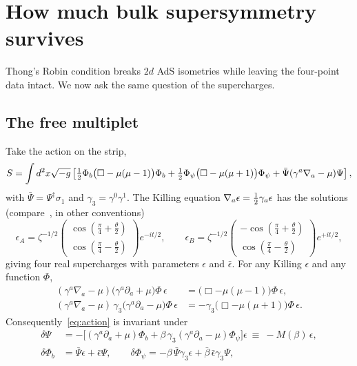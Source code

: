 \section{How much bulk supersymmetry survives}
\label{sec:susy}

Thong's Robin condition breaks $2d$ AdS isometries while leaving the four-point data intact. We now ask the same question of the supercharges.

\subsection{The free multiplet}

Take the action on the strip,
\begin{equation}\label{eq:action}
S=\int d^2x\sqrt{-g}\left[\tfrac12\Phi_b\big(\Box-\mu(\mu-1)\big)\Phi_b+\tfrac12\Phi_\psi\big(\Box-\mu(\mu+1)\big)\Phi_\psi+\bar\Psi(\gamma^a\nabla_a-\mu)\Psi\right],
\end{equation}
with $\bar\Psi=\Psi^\dagger\sigma_1$ and $\gamma_3=\gamma^0\gamma^1$. The Killing equation $\nabla_a\epsilon=\tfrac12\gamma_a\epsilon$ has the solutions (compare~\cite[(A.7)]{Correa:2019rdk}, in other conventions)
\begin{equation}\label{eq:killing}
\epsilon_A=\zeta^{-1/2}\begin{pmatrix}\cos(\frac\pi4+\frac\theta2)\\ \cos(\frac\pi4-\frac\theta2)\end{pmatrix}e^{-it/2},\qquad\epsilon_B=\zeta^{-1/2}\begin{pmatrix}-\cos(\frac\pi4+\frac\theta2)\\ \cos(\frac\pi4-\frac\theta2)\end{pmatrix}e^{+it/2},
\end{equation}
giving four real supercharges with parameters $\epsilon$ and $\bar\epsilon$. For any Killing $\epsilon$ and any function $\Phi$,
\begin{equation}\label{eq:intertwine}
\begin{aligned}
(\gamma^a\nabla_a-\mu)\big(\gamma^a\partial_a+\mu\big)\Phi\,\epsilon&=\big(\Box-\mu(\mu-1)\big)\Phi\,\epsilon,\\
(\gamma^a\nabla_a-\mu)\,\gamma_3\big(\gamma^a\partial_a-\mu\big)\Phi\,\epsilon&=-\gamma_3\big(\Box-\mu(\mu+1)\big)\Phi\,\epsilon.
\end{aligned}
\end{equation}
Consequently~\eqref{eq:action} is invariant under
\begin{equation}\label{eq:susy}
\begin{aligned}
\delta\Psi&=-\big[(\gamma^a\partial_a+\mu)\Phi_b+\beta\,\gamma_3(\gamma^a\partial_a-\mu)\Phi_\psi\big]\epsilon\ \equiv\ -M(\beta)\,\epsilon,\\
\delta\Phi_b&=\bar\Psi\epsilon+\bar\epsilon\Psi,\qquad\delta\Phi_\psi=-\beta\,\bar\Psi\gamma_3\epsilon+\bar\beta\,\bar\epsilon\gamma_3\Psi,
\end{aligned}
\end{equation}
